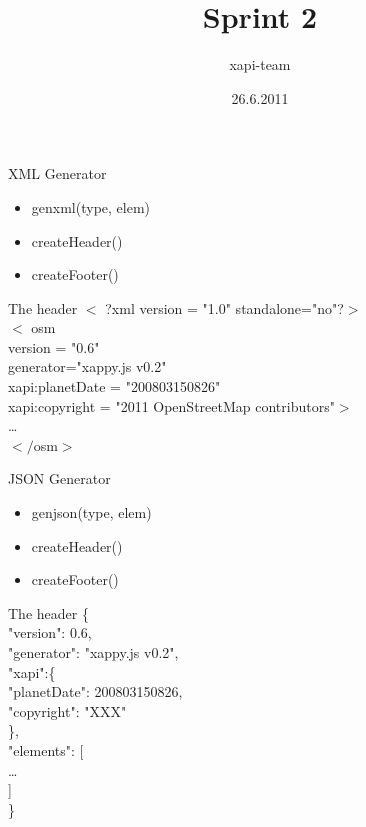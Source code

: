 \documentclass{beamer}
\title{Sprint 2}
\author{xapi-team}
\institute{Institute for Computer Science, Free University Berlin}
\date{26.6.2011}
\begin{document}
\begin{frame}
\titlepage
\end{frame}


\begin{frame}{XML Generator}
    \begin{itemize}
        \item genxml(type, elem)
        \item createHeader()
        \item createFooter()
    \end{itemize}

    \begin{block}{The header}
        $<$ ?xml version = "1.0" standalone="no"?$>$ \\
        $<$ osm \\
        version = "0.6" \\
        generator="xappy.js v0.2" \\
        xapi:planetDate = "200803150826"\\
        xapi:copyright = "2011 OpenStreetMap contributors"$>$\\
        \dots\\
        $</$osm$>$
    \end{block}
\end{frame}

\begin{frame}{JSON Generator}
    \begin{itemize}
        \item genjson(type, elem)
        \item createHeader()
        \item createFooter()
    \end{itemize}

    \begin{block}{The header}
        \{\\
            \hspace*{4mm}"version": 0.6,\\
            \hspace*{4mm} "generator": "xappy.js v0.2",\\
            \hspace*{4mm} "xapi":\{\\
            \hspace*{8mm} "planetDate": 200803150826,\\
            \hspace*{8mm} "copyright": "XXX"\\
            \hspace*{4mm} \},\\

            \hspace*{4mm}"elements": [\\
            \hspace*{8mm}\dots\\
            \hspace*{4mm}]\\
            \}
    \end{block}
\end{frame}
\end{document}
